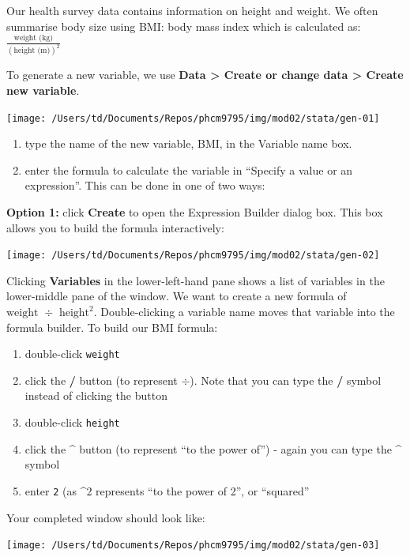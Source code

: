 \documentclass[
]{memoir}
\providecommand{\tightlist}{%
  \setlength{\itemsep}{0pt}\setlength{\parskip}{0pt}}
\begin{document}
Our health survey data contains information on height and weight. We often summarise body size using BMI: body mass index which is calculated as: \(\frac{\text{weight (kg)}}{(\text{height (m)})^2}\)

To generate a new variable, we use \textbf{Data \textgreater{} Create or change data \textgreater{} Create new variable}.

\texttt{[image: /Users/td/Documents/Repos/phcm9795/img/mod02/stata/gen-01]}

\begin{enumerate}
\def\labelenumi{\arabic{enumi})}
\tightlist
\item
  type the name of the new variable, BMI, in the Variable name box.
\item
  enter the formula to calculate the variable in ``Specify a value or an expression''. This can be done in one of two ways:
\end{enumerate}

\textbf{Option 1:} click \textbf{Create} to open the Expression Builder dialog box. This box allows you to build the formula interactively:

\texttt{[image: /Users/td/Documents/Repos/phcm9795/img/mod02/stata/gen-02]}

Clicking \textbf{Variables} in the lower-left-hand pane shows a list of variables in the lower-middle pane of the window. We want to create a new formula of \(\text{weight } \div \text{ height} ^2\). Double-clicking a variable name moves that variable into the formula builder. To build our BMI formula:

\begin{enumerate}
\def\labelenumi{\roman{enumi}.}
\tightlist
\item
  double-click \texttt{weight}
\item
  click the \textbf{/} button (to represent \(\div\)). Note that you can type the \textbf{/} symbol instead of clicking the button
\item
  double-click \texttt{height}
\item
  click the \textbf{\^{}} button (to represent ``to the power of'') - again you can type the \textbf{\^{}} symbol
\item
  enter \texttt{2} (as \^{}2 represents ``to the power of 2'', or ``squared''
\end{enumerate}

Your completed window should look like:

\texttt{[image: /Users/td/Documents/Repos/phcm9795/img/mod02/stata/gen-03]}
\end{document}
